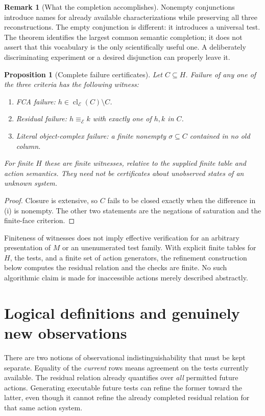 \documentclass[11pt]{article}
\newtheorem{proposition}[theorem]{Proposition}
\theoremstyle{definition}
\newtheorem{remark}[theorem]{Remark}
\newcommand{\cl}{\operatorname{cl}}
\begin{document}
\begin{remark}[What the completion accomplishes]
Nonempty conjunctions introduce names for already available
characterizations while preserving all three reconstructions. The empty
conjunction is different: it introduces a universal test. The theorem
identifies the largest common semantic completion; it does not assert that
this vocabulary is the only scientifically useful one. A deliberately
discriminating experiment or a desired disjunction can properly leave it.
\end{remark}

\begin{proposition}[Complete failure certificates]\label{prop:certificates}
Let $C\subseteq H$. Failure of any one of the three criteria has the
following witness:
\begin{enumerate}[label=(\roman*)]
\item FCA failure: $h\in\cl_{\mathcal E}(C)\setminus C$.
\item Residual failure: $h\equiv_{\mathcal E}k$ with exactly one of
      $h,k$ in $C$.
\item Literal object-complex failure: a finite nonempty
      $\sigma\subseteq C$ contained in no old column.
\end{enumerate}
For finite $H$ these are finite witnesses, relative to the supplied finite
table and action semantics. They need not be certificates about unobserved
states of an unknown system.
\end{proposition}
\begin{proof}
Closure is extensive, so $C$ fails to be closed exactly when the difference
in (i) is nonempty. The other two statements are the negations of
saturation and the finite-face criterion.
\end{proof}

Finiteness of witnesses does not imply effective verification for an
arbitrary presentation of $M$ or an unenumerated test family. With explicit
finite tables for $H$, the tests, and a finite set of action generators,
the refinement construction below computes the residual relation and the
checks are finite. No such algorithmic claim is made for inaccessible
actions merely described abstractly.

\section{Logical definitions and genuinely new observations}

There are two notions of observational indistinguishability that must be
kept separate. Equality of the \emph{current} rows means agreement on the
tests currently available. The residual relation already quantifies over
\emph{all} permitted future actions. Generating executable future tests can
refine the former toward the latter, even though it cannot refine the
already completed residual relation for that same action system.
\end{document}

